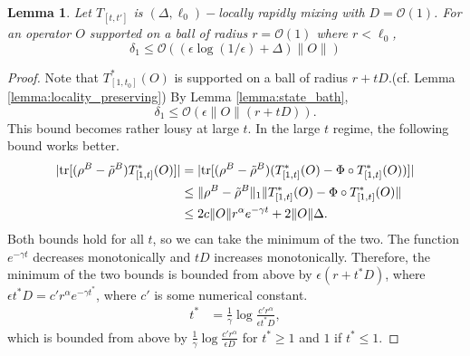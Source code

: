 \documentclass[prx,aps,amsmath,amssymb,floatfix,superscriptaddress,11pt,tightenlines,longbibliography,onecolumn,notitlepage]{revtex4-1}
\newcommand{\Tr}{\textnormal{tr}}
\newtheorem{lem}{Lemma}
\begin{document}
  \begin{lem}
    Let $T_{[t,t']}$ is $(\Delta, \ell_0)-$locally rapidly mixing with $D=\mathcal{O}(1)$. For an operator $O$ supported on a ball of radius $r=\mathcal{O}(1)$ where $r<\ell_0$,  
    \begin{equation}
      \delta_1 \leq \mathcal{O}((\epsilon \log(1/\epsilon) + \Delta) \|O \|)
    \end{equation}
  \end{lem}

\begin{proof}
  Note that $T_{[1,t_0]}^*(O)$ is supported on a ball of radius $r+tD$.(cf. Lemma \ref{lemma:locality_preserving}) By Lemma \ref{lemma:state_bath},
  \begin{equation}
    \delta_1 \leq \mathcal{O}(\epsilon \|O \|(r+tD)).
  \end{equation}
  This bound becomes rather lousy at large $t$. In the large $t$ regime, the following bound works better.
  \begin{equation}
    \begin{aligned}
      |\Tr[(\rho^B-\tilde{\rho}^B)T_{[1,t]}^*(O)]| &= |\Tr[(\rho^B-\tilde{\rho}^B) (T_{[1,t]}^*(O) -     \Phi \circ T_{[1,t]}^*(O))]| \\
      &\leq \|\rho^B - \tilde{\rho}^B\|_1 \|T_{[1,t]}^*(O) - \Phi\circ T_{[1,t]}^*(O) \| \\
      &\leq 2c\|O \|r^{\alpha} e^{-\gamma t} + 2\|O\|\Delta.
    \end{aligned}
    \end{equation}
    Both bounds hold for all $t$, so we can take the minimum of the two. The function $e^{-\gamma t}$ decreases monotonically and $tD$ increases monotonically. Therefore, the minimum of the two bounds is bounded from above by $\epsilon(r+t^*D)$, where $\epsilon t^*D = c'r^{\alpha}e^{-\gamma t^*}$, where $c'$ is some numerical constant.
    \begin{equation}
      \begin{aligned}
        t^{*} &=\frac{1}{\gamma}\log \frac{c'r^{\alpha}}{\epsilon  t^* D},
        \end{aligned}
      \end{equation}
      which is bounded from above by $\frac{1}{\gamma} \log \frac{c'r^{\alpha}}{\epsilon D}$ for $t^*\geq 1$ and $1$ if $t^*\leq 1$. 
\end{proof}
\end{document}
